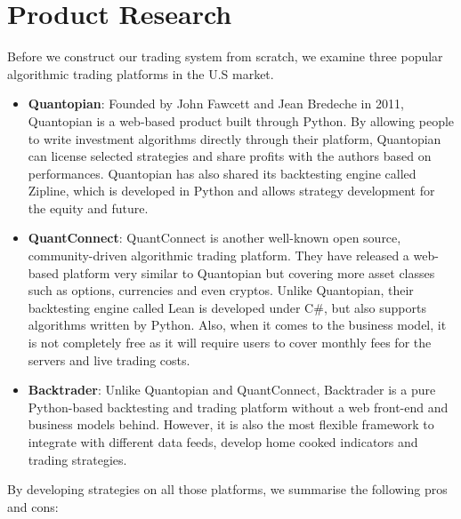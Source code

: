 \documentclass[12pt]{article}
\begin{document}
\section{Product Research}

Before we construct our trading system from scratch, we examine three popular algorithmic trading platforms in the U.S market.

\begin{itemize}
    \item \textbf{Quantopian}: Founded by John Fawcett and Jean Bredeche in 2011, Quantopian is a web-based product built through Python. \cite{quantopian} By allowing people to write investment algorithms directly through their platform, Quantopian can license selected strategies and share profits with the authors based on performances. Quantopian has also shared its backtesting engine called Zipline, which is developed in Python and allows strategy development for the equity and future. 
    \item \textbf{QuantConnect}: QuantConnect is another well-known open source, community-driven algorithmic trading platform. \cite{quantconnect} They have released a web-based platform very similar to Quantopian but covering more asset classes such as options, currencies and even cryptos. Unlike Quantopian, their backtesting engine called Lean is developed under C\#, but also supports algorithms written by Python. Also, when it comes to the business model, it is not completely free as it will require users to cover monthly fees for the servers and live trading costs.
    \item \textbf{Backtrader}: Unlike Quantopian and QuantConnect, Backtrader is a pure Python-based backtesting and trading platform without a web front-end and business models behind. \cite{backtrader} However, it is also the most flexible framework to integrate with different data feeds, develop home cooked indicators and trading strategies.
\end{itemize}

By developing strategies on all those platforms, we summarise the following pros and cons:
\end{document}
